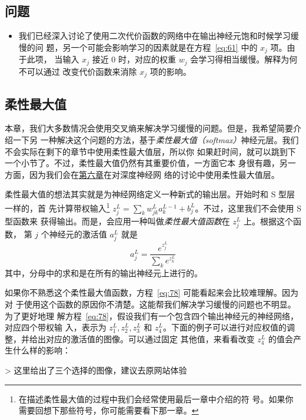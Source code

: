 \subsection*{问题}

\begin{itemize}
\item 我们已经深入讨论了使用二次代价函数的网络中在输出神经元饱和时候学习缓慢的问
  题，另一个可能会影响学习的因素就是在方程~\eqref{eq:61} 中的 $x_j$ 项。由于此项，
  当输入 $x_j$ 接近 $0$ 时，对应的权重 $w_j$ 会学习得相当缓慢。解释为何不可以通过
  改变代价函数来消除 $x_j$ 项的影响。
\end{itemize}

\subsection{柔性最大值}

本章，我们大多数情况会使用交叉熵来解决学习缓慢的问题。但是，我希望简要介绍一下另
一种解决这个问题的方法，基于\emph{柔性最大值（softmax）}神经元层。我们不会实际在剩下的章节中使用柔性最大值层，所以你
如果赶时间，就可以跳到下一个小节了。不过，柔性最大值仍然有其重要价值，一方面它本
身很有趣，另一方面，因为我们会在\hyperref[ch:Deeplearning]{第六章}在对深度神经网
络的讨论中使用柔性最大值层。

柔性最大值的想法其实就是为神经网络定义一种新式的输出层。开始时和 S 型层一样的，首
先计算带权输入\footnote{在描述柔性最大值的过程中我们会经常使用最后一章中介绍的符
  号。如果你需要回想下那些符号，你可能需要看下那一章。}
$z^L_j = \sum_{k} w^L_{jk} a^{L-1}_k + b^L_j$。不过，这里我们不会使用 S 型函数来
获得输出。而是，会应用一种叫做\emph{柔性最大值函数}在 $z^L_j$ 上。根据这个函数，
第 $j$ 个神经元的激活值 $a^L_j$ 就是
\begin{equation} 
  a^L_j = \frac{e^{z^L_j}}{\sum_k e^{z^L_k}}
  \label{eq:78}\tag{78}
\end{equation}
其中，分母中的求和是在所有的输出神经元上进行的。

如果你不熟悉这个柔性最大值函数，方程~\eqref{eq:78} 可能看起来会比较难理解。因为对
于使用这个函数的原因你不清楚。这能帮我们解决学习缓慢的问题也不明显。为了更好地理
解方程~\eqref{eq:78}，假设我们有一个包含四个输出神经元的神经网络，对应四个带权输
入，表示为 $z^L_1, z^L_2, z^L_3$ 和
$z^L_4$。下面的例子可以进行对应权值的调整，并给出对应的激活值的图像。可以通过固定
其他值，来看看改变 $z^L_4$ 的值会产生什么样的影响：

> 这里给出了三个选择的图像，建议去原网站体验

